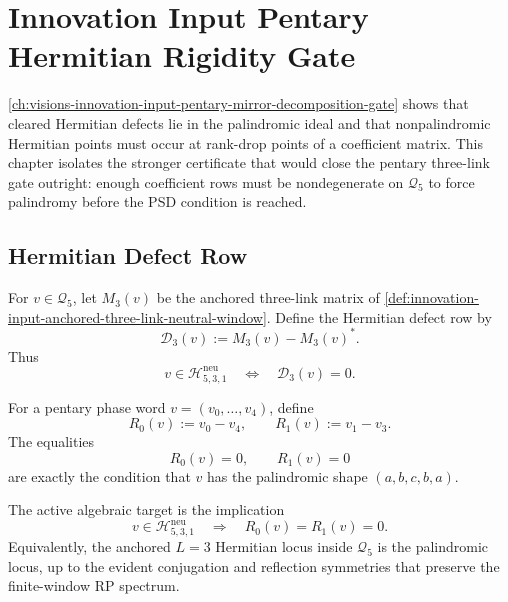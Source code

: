 \chapter{Innovation Input Pentary Hermitian Rigidity Gate}
\label{ch:visions-innovation-input-pentary-hermitian-rigidity-gate}

\autoref{ch:visions-innovation-input-pentary-mirror-decomposition-gate}
shows that cleared Hermitian defects lie in the palindromic ideal and
that nonpalindromic Hermitian points must occur at rank-drop points of a
coefficient matrix. This chapter isolates the stronger certificate that
would close the pentary three-link gate outright: enough coefficient rows
must be nondegenerate on $\mathcal Q_5$ to force palindromy before the PSD
condition is reached.

\section{Hermitian Defect Row}
\label{sec:innovation-input-pentary-hermitian-defect-row}

\begin{definition}
\label{def:innovation-input-three-link-hermitian-defect}
For $v\in\mathcal Q_5$, let $M_3(v)$ be the anchored three-link matrix of
\autoref{def:innovation-input-anchored-three-link-neutral-window}. Define
the Hermitian defect row by
$$
\mathcal D_3(v):=M_3(v)-M_3(v)^*.
$$
Thus
$$
v\in\mathcal H_{5,3,1}^{\mathrm{neu}}
\quad\Longleftrightarrow\quad
\mathcal D_3(v)=0.
$$
\end{definition}

\begin{definition}
\label{def:innovation-input-nonpalindromic-defect-coordinates}
For a pentary phase word $v=(v_0,\ldots,v_4)$, define
$$
R_0(v):=v_0-v_4,
\qquad
R_1(v):=v_1-v_3.
$$
The equalities
$$
R_0(v)=0,
\qquad
R_1(v)=0
$$
are exactly the condition that $v$ has the palindromic shape
$(a,b,c,b,a)$.
\end{definition}

\begin{principle}
\label{prin:innovation-input-pentary-hermitian-rigidity-target}
The active algebraic target is the implication
$$
v\in\mathcal H_{5,3,1}^{\mathrm{neu}}
\quad\Longrightarrow\quad
R_0(v)=R_1(v)=0.
$$
Equivalently, the anchored $L=3$ Hermitian locus inside $\mathcal Q_5$ is
the palindromic locus, up to the evident conjugation and reflection
symmetries that preserve the finite-window RP spectrum.
\end{principle}

